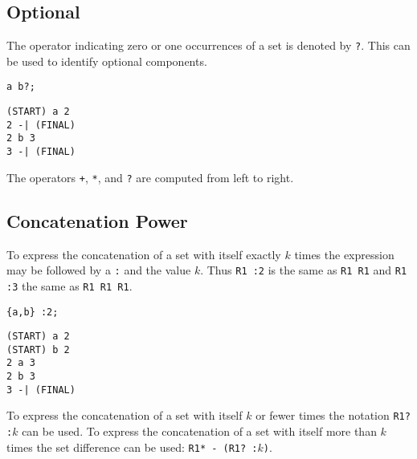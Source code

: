 \subsection{Optional}
The operator indicating zero or one occurrences of a set is denoted by
\verb#?#.
This can be used to identify optional components.
\begin{center}\begin{minipage}[t]{3in}\begin{minipage}[t]{3in}\begin{tabbing}
\qquad \= \verb#a b?;#
\end{tabbing}\end{minipage}\end{minipage}
\begin{minipage}[t]{1.6in}\begin{verbatim}
(START) a 2
2 -| (FINAL)
2 b 3
3 -| (FINAL)
\end{verbatim}\end{minipage}\end{center}
The operators \verb#+#, \verb#*#, and \verb#?# are computed from left to
right.

\subsection{Concatenation Power}
To express the concatenation of a set with itself exactly $k$ times the
expression may be followed by a \verb#:# and the value $k$.
Thus \verb#R1 :2# is the same as \verb#R1 R1# and \verb#R1 :3# the same as
\verb#R1 R1 R1#.
\begin{center}\begin{minipage}[t]{3in}\begin{minipage}[t]{3in}\begin{tabbing}
\qquad \= \verb#{a,b} :2;#
\end{tabbing}\end{minipage}\end{minipage}
\begin{minipage}[t]{1.6in}\begin{verbatim}
(START) a 2
(START) b 2
2 a 3
2 b 3
3 -| (FINAL)
\end{verbatim}\end{minipage}\end{center}
To express the concatenation of a set with itself $k$ or fewer times the
notation \verb#R1? :#$k$ can be used.
To express the concatenation of a set with itself more than $k$ times the
set difference can be used: \verb#R1* - (R1? :#$k$\verb#)#.

